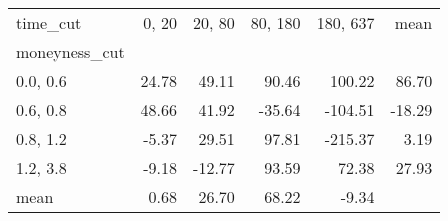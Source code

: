 \begin{tabular}{lrrrrr}
\toprule
time\_cut &  0, 20 &  20, 80 &  80, 180 &  180, 637 &   mean \\
moneyness\_cut &          &           &            &             &        \\
\midrule
0.0, 0.6    &    24.78 &     49.11 &      90.46 &      100.22 &  86.70 \\
0.6, 0.8    &    48.66 &     41.92 &     -35.64 &     -104.51 & -18.29 \\
0.8, 1.2    &    -5.37 &     29.51 &      97.81 &     -215.37 &   3.19 \\
1.2, 3.8    &    -9.18 &    -12.77 &      93.59 &       72.38 &  27.93 \\
mean          &     0.68 &     26.70 &      68.22 &       -9.34 &        \\
\bottomrule
\end{tabular}

